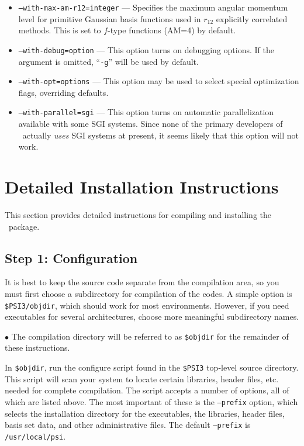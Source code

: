 \documentclass[12pt]{article}
\begin{document}
\begin{itemize}
\item {\tt --with-max-am-r12=integer} --- Specifies the maximum
  angular momentum level for primitive Gaussian basis functions used
  in $r_{12}$ explicitly correlated methods.  This is set to $f$-type
  functions (AM=4) by default.
\item {\tt --with-debug=option} --- This option turns on debugging
  options.  If the argument is omitted, ``{\tt -g}'' will be used by default.
\item {\tt --with-opt=options} --- This option may be used to select
  special optimization flags, overriding defaults.
\item {\tt --with-parallel=sgi} --- This option turns on automatic
  parallelization available with some SGI systems.  Since none of the
  primary developers of \PSIthree\ actually {\em uses} SGI systems at
  present, it seems likely that this option will not work.
\end{itemize}

\section{Detailed Installation Instructions}

This section provides detailed instructions for compiling and
installing the \PSIthree\ package.  

\subsection{Step 1: Configuration}

It is best to keep the source code separate from the compilation area, so
you must first choose a subdirectory for compilation of the codes.  A simple
option is {\tt \$PSI3/objdir}, which should work for most environments.
However, if you need executables for several architectures, choose more
meaningful subdirectory names.

$\bullet$ The compilation directory will be referred to as {\tt \$objdir}
for the remainder of these instructions.

In {\tt \$objdir}, run the configure script found in the {\tt \$PSI3}
top-level source directory.  This script will scan your system to locate
certain libraries, header files, etc. needed for complete compilation.
The script accepts a number of options, all of which are listed above.
The most important of these is the {\tt --prefix} option, which selects the
installation directory for the executables, the libraries, header files,
basis set data, and other administrative files.  The default {\tt --prefix}
is {\tt /usr/local/psi}.
\end{document}
